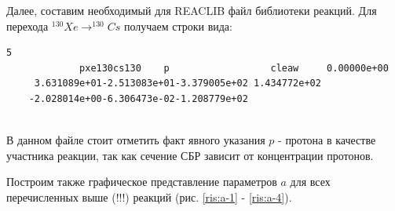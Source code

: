 \documentclass[%
master,    %
natbib,      %
subf,        %
href,        %
colorlinks,  %
]{disser}
\begin{document}
Далее, составим необходимый для REACLIB файл библиотеки реакций. Для перехода $^{130}Xe \to ^{130}Cs$ получаем строки вида: 

\begin{lstlisting}[label={lst:label}]
	5
	         pxe130cs130    p                  cleaw     0.00000e+00          
	 3.631089e+01-2.513083e+01-3.379005e+02 1.434772e+02                      
	-2.028014e+00-6.306473e-02-1.208779e+02                                   
	
\end{lstlisting}

В данном файле стоит отметить факт явного указания $p$ - протона в качестве участника реакции, так как сечение СБР зависит от концентрации протонов. 

Построим также графическое представление параметров $a$ для всех перечисленных выше (!!!) реакций  (рис. \ref{ris:a-1} - \ref{ris:a-4}).
\end{document}
